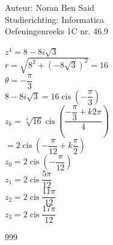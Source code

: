 \documentclass[a4paper]{article}
\begin{document}
\noindent \large Auteur: Noran Ben Said \\
\noindent \large Studierichting: Informatica\\
\noindent \large Oefeningenreeks 1C nr. 46.9\\

\medskip
\normalsize

$z^4 = 8 - 8i\sqrt{3}$\\

$r = \sqrt{8^2 + (-8\sqrt{3})^2} = 16$\\

$\theta = -\dfrac{\pi}{3}$\\

$8 - 8i\sqrt{3} = 16 \operatorname{cis} \left( -\dfrac{\pi}{3} \right)$\\

$z_k = \sqrt[4]{16} \operatorname{cis} \left( \dfrac{-\dfrac{\pi}{3} + k2\pi}{4} \right)$\\

$= 2 \operatorname{cis} \left( -\dfrac{\pi}{12} + k\dfrac{\pi}{2} \right)$\\

$z_0 = 2 \operatorname{cis} \left( -\dfrac{\pi}{12} \right)$\\

$z_1 = 2 \operatorname{cis} \dfrac{5\pi}{12}$\\

$z_2 = 2 \operatorname{cis} \dfrac{11\pi}{12}$\\

$z_3 = 2 \operatorname{cis} \dfrac{17\pi}{12}$\\


\begin{thebibliography}{999}
\end{thebibliography}
\end{document}
